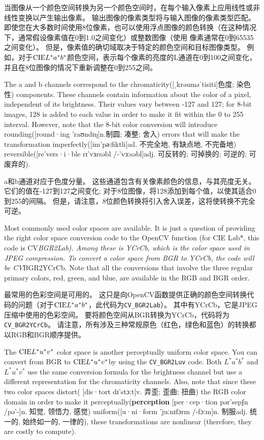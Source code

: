 \documentclass[]{article}
\begin{document}
当图像从一个颜色空间转换为另一个颜色空间时，在每个输入像素上应用线性或非线性变换以产生输出像素。
输出图像的像素类型将与输入图像的像素类型匹配。
即使您在大多数时间使用8位像素，也可以使用浮点图像的颜色转换（在这种情况下，通常假设像素值在0到1.0之间变化）或整数图像（使用
像素通常在0到65535之间变化）。
但是，像素值的确切域取决于特定的颜色空间和目标图像类型。
例如，对于\( \text{CIE}  \space L^{*} a^{*} b^{*} \)颜色空间，表示每个像素的亮度的L通道在0到100之间变化，并且在8位图像的情况下重新调整在0到255之间。

The a and b channels correspond to the
chromaticity({[}ˌkrəuməˈtisiti{]}色度; 染色性) components. These
channels contain information about the color of a pixel, independent of
its brightness. Their values vary between -127 and 127; for 8-bit
images, 128 is added to each value in order to make it fit within the 0
to 255 interval. However, note that the 8-bit color conversion will
introduce rounding({[}round·ing \textbar{}\textbar{} 'raʊndɪŋ{]}n.制圆;
凑整; 舍入) errors that will make the transformation
imperfectly({[}im'pә:fiktli{]}ad. 不完全地, 有缺点地, 不完备地)
reversible({[}re'vers·i·ble \textbar{}\textbar{} rɪ'vɜrsəbl
/-'vɜːsəbl{]}adj. 可反转的; 可掉换的; 可逆的; 可废弃的).

a和b通道对应于色度分量。 这些通道包含有关像素颜色的信息，与其亮度无关。
它们的值在-127到127之间变化;
对于8位图像，将128添加到每个值，以使其适合0到255的间隔。
但是，请注意，8位颜色转换将引入舍入误差，这将使转换不完全可逆。

Most commonly used color spaces are available. It is just a question of
providing the right color space conversion code to the OpenCV function
(for CIE L\emph{a}b*, this code is CV\emph{BGR2Lab). Among these is
YCrCb, which is the color space used in JPEG compression. To convert a
color space from BGR to YCrCb, the code will be CV}BGR2YCrCb. Note that
all the conversions that involve the three regular primary colors, red,
green, and blue, are available in the RGB and BGR order.

最常用的色彩空间是可用的。
这只是向OpenCV函数提供正确的颜色空间转换代码的问题（对于\( \text{CIE}  \space L^{*} a^{*} b^{*} \)，此代码为\texttt{CV\_BGR2Lab}）。
其中有YCrCb，它是JPEG压缩中使用的色彩空间。
要将颜色空间从BGR转换为YCrCb，代码将为\texttt{CV\_BGR2YCrCb}。
请注意，所有涉及三种常规原色（红色，绿色和蓝色）的转换都以RGB和BGR顺序提供。

The \( \text{CIE}  \space L^{*} u^{*} v^{*} \) color space is another
perceptually uniform color space. You can convert from BGR to
\(\text{CIE}  \space L^{*} u^{*} v^{*} \)by using the
\texttt{CV\_BGR2Luv} code. Both \( L^{*} a^{*} b^{*} \) and
\( L^{*} u^{*} v^{*} \) use the same conversion formula for the
brightness channel but use a different representation for the
chromaticity channels. Also, note that since these two color spaces
distort( {[}dis·tort \textbar{}\textbar{} dɪ'stɔːt{]}v. 弄歪; 歪曲;
扭曲) the RGB color domain in order to make it
perceptually(\textbf{perception} {[}per·cep·tion \textbar{}\textbar{}
pər'sepʃn /pə'-{]}n. 知觉, 领悟力, 感觉) uniform({[}u·ni·form
\textbar{}\textbar{} 'juːnɪfɔrm /-fɔːm{]}n. 制服adj. 统一的, 始终如一的,
一律的), these transformations are nonlinear (therefore, they are costly
to compute).
\end{document}
